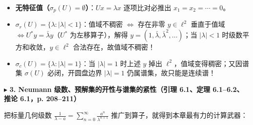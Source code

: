 \documentclass[11pt,a4paper]{article}
\providecommand{\tightlist}{\setlength{\itemsep}{2pt}\setlength{\parskip}{0pt}}
\newcommand{\SubSubHeading}[1]{%
  \Needspace{6.5\baselineskip}\vspace{5.5pt}\noindent
  \textcolor{AccentMain}{\scriptsize$\blacktriangleright$}\hspace{4pt}%
  {\small\bfseries\color{AccentMain}#1}\par\nopagebreak[4]\vspace{2.5pt}%
}
\begin{document}
\begin{enumerate}
  \begin{itemize}
  \tightlist
  \item
    \textbf{无特征值（\(\sigma_p(U)=\emptyset\)）}：\(Ux=\lambda x\) 逐项比对必推出 \(x_1 = x_2 = \cdots = 0\)。
  \item
    \textbf{\(\sigma_r(U) = \{\lambda : \lvert\lambda\rvert < 1\}\)}：值域不稠密 \(\iff\) 存在非零 \(y \in \ell^2\) 垂直于值域 \(\iff U^*y = \bar{\lambda}y\)（\(U^*\) 为左移算子），解得 \(y = (1, \bar{\lambda}, \bar{\lambda}^2, \dots)\)；当 \(\lvert\lambda\rvert < 1\) 时级数平方和收敛，\(y \in \ell^2\) 合法存在，故值域不稠密！
  \item
    \textbf{\(\sigma_c(U) = \{\lambda : \lvert\lambda\rvert = 1\}\)}：当 \(\lvert\lambda\rvert = 1\) 时上述 \(y\) 掉出 \(\ell^2\)，值域变得稠密；又因谱集 \(\sigma(U)\) 必闭，开圆盘边界 \(\lvert\lambda\rvert = 1\) 仍属谱集，故只能是连续谱！
  \end{itemize}
\end{enumerate}

\SubSubHeading{3. Neumann 级数、预解集的开性与谱集的紧性（引理 6.1、定理 6.1--6.2、推论 6.1，p. 208--211）}

把标量几何级数 \(\frac{1}{\lambda - a} = \sum_{n=0}^\infty \frac{a^n}{\lambda^{n+1}}\) 推广到算子，就得到本章最有力的计算武器：
\end{document}
